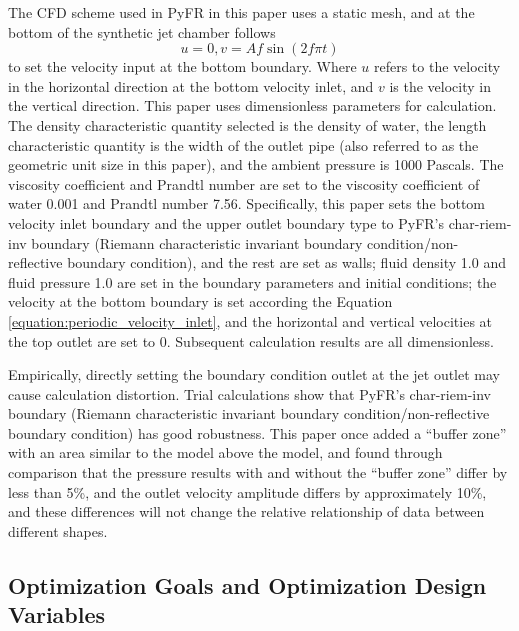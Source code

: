 \documentclass{article}
\begin{document}
The CFD scheme used in PyFR in this paper uses a static mesh, and at the bottom of the synthetic jet chamber follows
\begin{equation}u=0, v=Af\sin(2f\pi t)\label{equation:periodic_velocity_inlet}\end{equation}
to set the velocity input at the bottom boundary.
Where $u$ refers to the velocity in the horizontal direction at the bottom velocity inlet, and $v$ is the velocity in the vertical direction.
This paper uses dimensionless parameters for calculation.
The density characteristic quantity selected is the density of water, the length characteristic quantity is the width of the outlet pipe (also referred to as the geometric unit size in this paper), and the ambient pressure is 1000 Pascals.
The viscosity coefficient and Prandtl number are set to the viscosity coefficient of water 0.001 and Prandtl number 7.56.
Specifically, this paper sets the bottom velocity inlet boundary and the upper outlet boundary type to PyFR's char-riem-inv boundary (Riemann characteristic invariant boundary condition/non-reflective boundary condition),
and the rest are set as walls; fluid density 1.0 and fluid pressure 1.0 are set in the boundary parameters and initial conditions;
the velocity at the bottom boundary is set according the Equation \ref{equation:periodic_velocity_inlet}, and the horizontal and vertical velocities at the top outlet are set to 0. Subsequent
calculation results are all dimensionless.

Empirically, directly setting the boundary condition outlet at the jet outlet may cause calculation distortion.
Trial calculations show that PyFR's char-riem-inv boundary (Riemann characteristic invariant boundary condition/non-reflective boundary condition) has good robustness.
This paper once added a ``buffer zone'' with an area similar to the model above the model,
and found through comparison that the pressure results with and without the ``buffer zone'' differ by less than 5\%, and the outlet velocity amplitude differs by approximately 10\%,
and these differences will not change the relative relationship of data between different shapes.

\subsection{Optimization Goals and Optimization Design Variables}\indent
\end{document}
